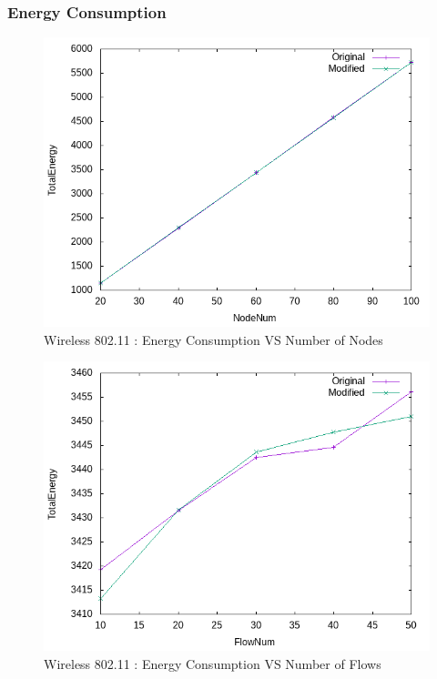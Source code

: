 \subsubsection{Energy Consumption}
    \begin{figure}[!h] 
        \centering
        \includegraphics[width=.8\textwidth]{Pictures/Wireless802.11Mobile/Combined/TotalEnergyVSNodeNum.png}
         \caption{Wireless 802.11 : Energy Consumption VS Number of Nodes}
    \end{figure}
    
     \begin{figure}[!h] 
        \centering
        \includegraphics[width=.8\textwidth]{Pictures/Wireless802.11Mobile/Combined/TotalEnergyVSFlowNum.png}
         \caption{Wireless 802.11 : Energy Consumption VS Number of Flows}
    \end{figure}
    
